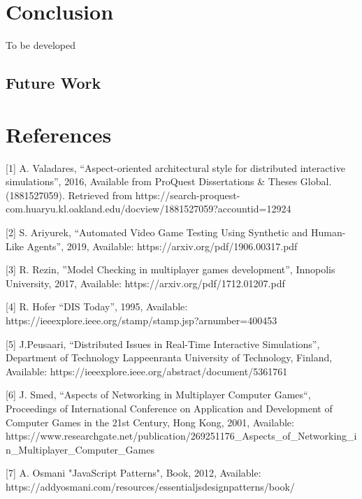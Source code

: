 \documentclass[conference]{IEEEtran}
\begin{document}
\section{Conclusion}

To be developed 

\subsection{Future Work}

\section{References}
[1] A. Valadares, “Aspect-oriented architectural style for distributed interactive simulations”, 2016, 
Available from ProQuest Dissertations \& Theses Global. (1881527059). 
Retrieved from https://search-proquest-com.huaryu.kl.oakland.edu/docview/1881527059?accountid=12924

[2] S. Ariyurek, “Automated Video Game Testing Using
Synthetic and Human-Like Agents”, 2019, Available: https://arxiv.org/pdf/1906.00317.pdf
	
[3] R. Rezin, ”Model Checking in multiplayer games development”, Innopolis University, 
2017, Available: https://arxiv.org/pdf/1712.01207.pdf

[4] R. Hofer “DIS Today”, 1995, Available:
https://ieeexplore.ieee.org/stamp/stamp.jsp?arnumber=400453

[5] J.Peusaari, “Distributed Issues in Real-Time Interactive Simulations”, Department of Technology Lappeenranta University of Technology, Finland,
 Available: https://ieeexplore.ieee.org/abstract/document/5361761
 
[6] J. Smed, “Aspects of Networking in Multiplayer Computer Games“, Proceedings of International Conference on Application and Development of Computer Games in the 21st Century, Hong Kong, 2001,
Available: https://www.researchgate.net/publication/269251176\_Aspects\_of\_Networking\_in\_Multiplayer\_Computer\_Games

[7] A. Osmani "JavaScript Patterns", Book, 2012, Available: https://addyosmani.com/resources/essentialjsdesignpatterns/book/
\end{document}

